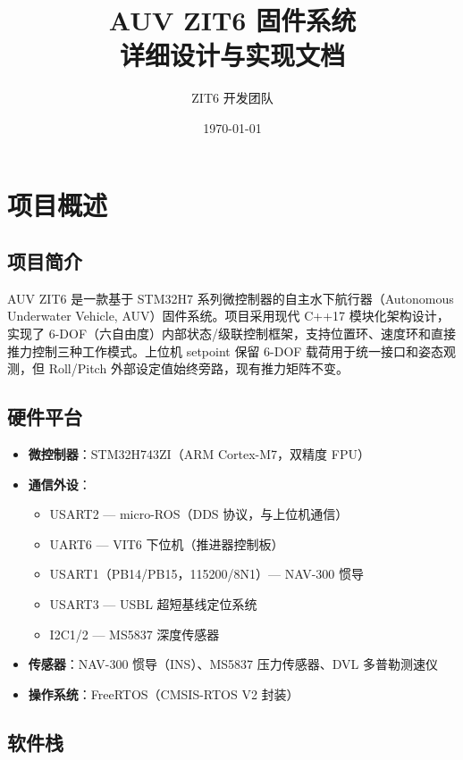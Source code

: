 \documentclass[12pt,a4paper]{article}
\title{\textbf{AUV ZIT6 固件系统}\\ \Large 详细设计与实现文档}
\author{ZIT6 开发团队}
\date{\today}
\begin{document}
\maketitle
\newpage

\tableofcontents
\newpage

\section{项目概述}

\subsection{项目简介}

AUV ZIT6 是一款基于 STM32H7 系列微控制器的自主水下航行器（Autonomous Underwater Vehicle, AUV）固件系统。项目采用现代 C++17 模块化架构设计，实现了 6-DOF（六自由度）内部状态/级联控制框架，支持位置环、速度环和直接推力控制三种工作模式。上位机 setpoint 保留 6-DOF 载荷用于统一接口和姿态观测，但 Roll/Pitch 外部设定值始终旁路，现有推力矩阵不变。

\subsection{硬件平台}

\begin{itemize}
    \item \textbf{微控制器}：STM32H743ZI（ARM Cortex-M7，双精度 FPU）
    \item \textbf{通信外设}：
    \begin{itemize}
        \item USART2 — micro-ROS（DDS 协议，与上位机通信）
        \item UART6 — VIT6 下位机（推进器控制板）
        \item USART1（PB14/PB15，115200/8N1）— NAV-300 惯导
        \item USART3 — USBL 超短基线定位系统
        \item I2C1/2 — MS5837 深度传感器
    \end{itemize}
    \item \textbf{传感器}：NAV-300 惯导（INS）、MS5837 压力传感器、DVL 多普勒测速仪
    \item \textbf{操作系统}：FreeRTOS（CMSIS-RTOS V2 封装）
\end{itemize}

\subsection{软件栈}
\end{document}
